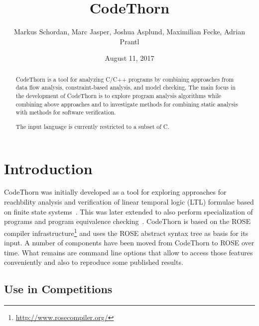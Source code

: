 \documentclass[natbib]{article}
\begin{document}
\title{CodeThorn}

\author{\small Markus Schordan, Marc Jasper, Joshua Asplund, Maximilian Fecke, Adrian Prantl}
\date{August 11, 2017}

\maketitle

\begin{abstract}
\noindent CodeThorn is a tool for analyzing C/C++ programs by combining approaches
from data flow analysis, constraint-based analysis, and model
checking. The main focus in the development of CodeThorn is to explore program analysis algorithms while combining above
approaches and to investigate methods for combining static analysis with
methods for software verification.

The input language is currently restricted to a subset of C.

\end{abstract}

\tableofcontents


\section{Introduction}
\label{sec:intro}

CodeThorn was initially developed as a tool for exploring approaches
for reachbility analysis and verification of linear temporal logic (LTL)
formulae based on finite state systems~\cite{schordan2014combining}. 
This was later extended to
also perform specialization of programs and program equivalence
checking~\cite{schordan2014verification}. CodeThorn is based on the 
ROSE compiler infrastructure\footnote{\url{http://www.rosecompiler.org/}} 
and uses the ROSE abstract syntax tree as basis for its input. 
A number of components have been moved
from CodeThorn to ROSE over time. What remains are command line
options that allow to access those features conveniently and also to
reproduce some published results.

\nocite{roseWWW}

\subsection{Use in Competitions}
\end{document}
